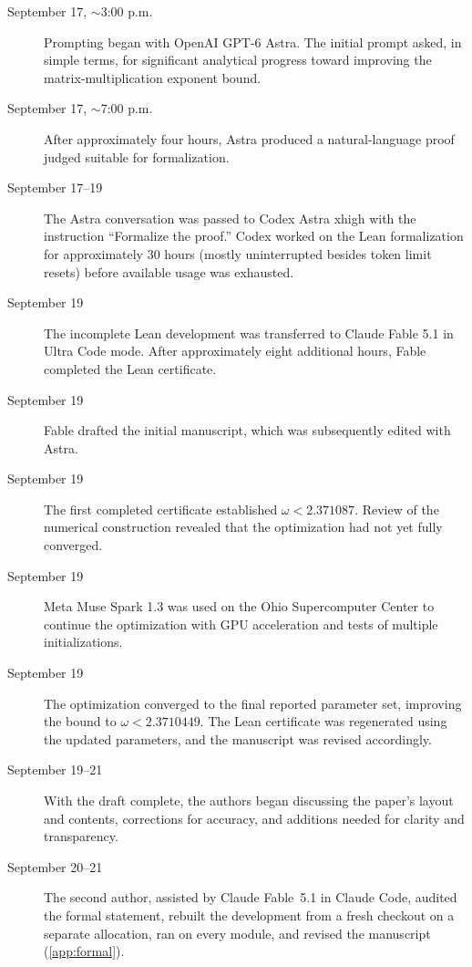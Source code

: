 \documentclass[11pt,a4paper]{article}
\begin{document}
\begin{description}
\item[September 17, $\sim$3:00 p.m.] Prompting began with OpenAI GPT-6 Astra. The initial prompt asked, in simple terms, for significant analytical progress toward improving the matrix-multiplication exponent bound.

\item[September 17, $\sim$7:00 p.m.] After approximately four hours, Astra produced a natural-language proof judged suitable for formalization.

\item[September 17--19] The Astra conversation was passed to Codex Astra xhigh with the instruction ``Formalize the proof.'' Codex worked on the Lean formalization for approximately 30 hours (mostly uninterrupted besides token limit resets) before available usage was exhausted.

\item[September 19] The incomplete Lean development was transferred to Claude Fable 5.1 in Ultra Code mode. After approximately eight additional hours, Fable completed the Lean certificate.

\item[September 19] Fable drafted the initial manuscript, which was subsequently edited with Astra.

\item[September 19] The first completed certificate established $\omega<2.371087$. Review of the numerical construction revealed that the optimization had not yet fully converged.

\item[September 19] Meta Muse Spark 1.3 was used on the Ohio Supercomputer Center to continue the optimization with GPU acceleration and tests of multiple initializations.

\item[September 19] The optimization converged to the final reported parameter set, improving the bound to $\omega<2.3710449$. The Lean certificate was regenerated using the updated parameters, and the manuscript was revised accordingly.

\item[September 19--21] With the draft complete, the authors began discussing the paper's layout and contents, corrections for accuracy, and additions needed for clarity and transparency.

\item[September 20--21] The second author, assisted by Claude Fable~5.1 in Claude Code, audited the formal statement, rebuilt the development from a fresh checkout on a separate allocation, ran  on every module, and revised the manuscript (\cref{app:formal}).

\end{description}
\end{document}
